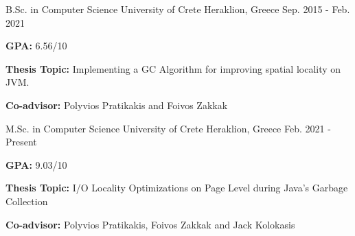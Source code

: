 
\begin{cventries}

  \cventry
    {B.Sc. in Computer Science} %
    {University of Crete} %
    {Heraklion, Greece} %
    {Sep. 2015 - Feb. 2021} %
    {
      \begin{cvitems} %
      	\item{\textbf{GPA:} 6.56/10}
      	\item{\textbf{Thesis Topic:} Implementing a GC Algorithm for improving spatial locality on JVM.}
      	\item{\textbf{Co-advisor:} Polyvios Pratikakis and Foivos Zakkak}
      \end{cvitems}
    }


  \cventry
    {M.Sc. in Computer Science} %
    {University of Crete} %
    {Heraklion, Greece} %
    {Feb. 2021 -  Present} %
    {
      \begin{cvitems} %
        \item{\textbf{GPA:} 9.03/10}
        \item{\textbf{Thesis Topic:} I/O Locality Optimizations on Page Level during Java’s Garbage Collection}
        \item{\textbf{Co-advisor:} Polyvios Pratikakis, Foivos Zakkak and Jack Kolokasis}
      \end{cvitems}
    }
\end{cventries}
